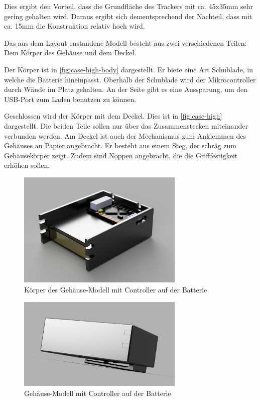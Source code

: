 Dies ergibt den Vorteil, dass die Grundfläche des Trackers mit ca. 45x35mm sehr gering gehalten wird.
Daraus ergibt sich dementsprechend der Nachteil, dass mit ca. 15mm die Konstruktion relativ hoch wird.

Das aus dem Layout enstandene Modell besteht aus zwei verschiedenen Teilen: Dem Körper des Gehäuse und dem Deckel.

Der Körper ist in \autoref{fig:case-high-body} dargestellt.
Er biete eine Art Schublade, in welche die Batterie hineinpasst.
Oberhalb der Schublade wird der Mikrocontroller durch Wände im Platz gehalten.
An der Seite gibt es eine Aussparung, um den \gls{USB}-Port zum Laden benutzen zu können.

Geschlossen wird der Körper mit dem Deckel.
Dies ist in \autoref{fig:case-high} dargestellt.
Die beiden Teile sollen nur über das Zusammenstecken miteinander verbunden werden.
Am Deckel ist auch der Mechanismus zum Anklemmen des Gehäuses an Papier angebracht.
Er besteht aus einem Steg, der schräg zum Gehäusekörper zeigt.
Zudem sind Noppen angebracht, die die Grifffestigkeit erhöhen sollen.

\begin{figure}[htbp]
	\includegraphics[width=300px]{images/case/high_body.png}
	\centering
	\caption{Körper des Gehäuse-Modell mit Controller auf der Batterie}
	\label{fig:case-high-body}
\end{figure}

\begin{figure}[htbp]
	\includegraphics[width=300px]{images/case/high_complete.png}
	\centering
	\caption{Gehäuse-Modell mit Controller auf der Batterie}
	\label{fig:case-high}
\end{figure}

